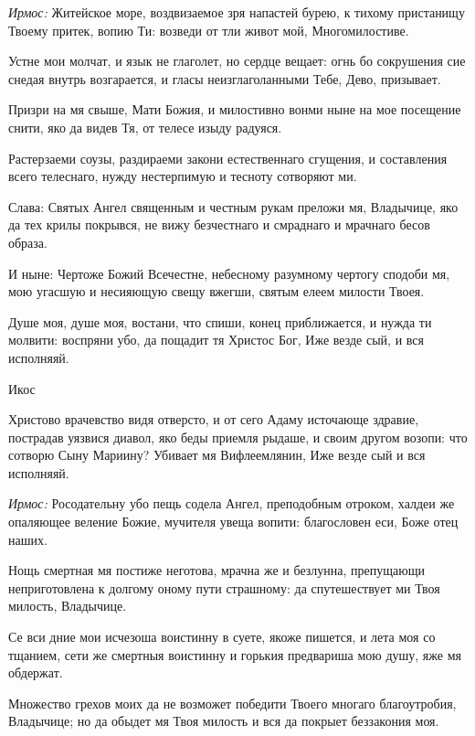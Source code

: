 \begin{mymulticols}


{\itshape Ирмос:} Житейское море, воздвизаемое зря напастей бурею, к тихому пристанищу Твоему притек, вопию Ти: возведи от тли живот мой, Многомилостиве. 

Устне мои молчат, и язык не глаголет, но сердце вещает: огнь бо сокрушения сие снедая внутрь возгарается, и гласы неизглаголанными Тебе, Дево, призывает. 

Призри на мя свыше, Мати Божия, и милостивно вонми ныне на мое посещение снити, яко да видев Тя, от телесе изыду радуяся. 

Растерзаеми соузы, раздираеми закони естественнаго сгущения, и составления всего телеснаго, нужду нестерпимую и тесноту сотворяют ми. 

Слава: Святых Ангел священным и честным рукам преложи мя, Владычице, яко да тех крилы покрывся, не вижу безчестнаго и смраднаго и мрачнаго бесов образа. 

И ныне: Чертоже Божий Всечестне, небесному разумному чертогу сподоби мя, мою угасшую и несияющую свещу вжегши, святым елеем милости Твоея.




Душе моя, душе моя, востани, что спиши, конец приближается, и нужда ти молвити: воспряни убо, да пощадит тя Христос Бог, Иже везде сый, и вся исполняяй. 

Икос 

Христово врачевство видя отверсто, и от сего Адаму источающе здравие, пострадав уязвися диавол, яко беды приемля рыдаше, и своим другом возопи: что сотворю Сыну Мариину? Убивает мя Вифлеемлянин, Иже везде сый и вся исполняяй.




{\itshape Ирмос:} Росодательну убо пещь содела Ангел, преподобным отроком, халдеи же опаляющее веление Божие, мучителя увеща вопити: благословен еси, Боже отец наших. 

Нощь смертная мя постиже неготова, мрачна же и безлунна, препущающи неприготовлена к долгому оному пути страшному: да спутешествует ми Твоя милость, Владычице. 

Се вси дние мои исчезоша воистинну в суете, якоже пишется, и лета моя со тщанием, сети же смертныя воистинну и горькия предвариша мою душу, яже мя обдержат. 

Множество грехов моих да не возможет победити Твоего многаго благоутробия, Владычице; но да обыдет мя Твоя милость и вся да покрыет беззакония моя. 


\end{mymulticols}
